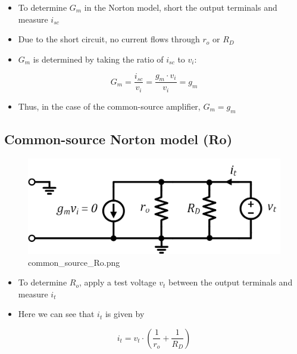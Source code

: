 \documentclass[11pt]{article}
\providecommand{\tightlist}{%
      \setlength{\itemsep}{0pt}\setlength{\parskip}{0pt}}
\begin{document}
    \begin{itemize}
\tightlist
\item
  To determine \(G_m\) in the Norton model, short the output terminals
  and measure \(i_{sc}\)
\item
  Due to the short circuit, no current flows through \(r_o\) or \(R_D\)
\item
  \(G_m\) is determined by taking the ratio of \(i_{sc}\) to \(v_i\):
\end{itemize}

\begin{equation}
G_m = \dfrac{i_{sc}}{v_i} = \dfrac{g_m \cdot v_i}{v_i}= g_m
\end{equation}

\begin{itemize}
\tightlist
\item
  Thus, in the case of the common-source amplifier, \(G_m = g_m\)
\end{itemize}

    \hypertarget{common-source-norton-model-ro}{%
\subsection{Common-source Norton model
(Ro)}\label{common-source-norton-model-ro}}

    \begin{figure}
\centering
\includegraphics{common_source_Ro.png}
\caption{common\_source\_Ro.png}
\end{figure}

    \begin{itemize}
\tightlist
\item
  To determine \(R_o\), apply a test voltage \(v_t\) between the output
  terminals and measure \(i_t\)
\item
  Here we can see that \(i_t\) is given by
\end{itemize}

\begin{equation}
i_t = v_t \cdot \left(\dfrac{1}{r_o} + \dfrac{1}{R_D} \right)
\end{equation}
\end{document}
